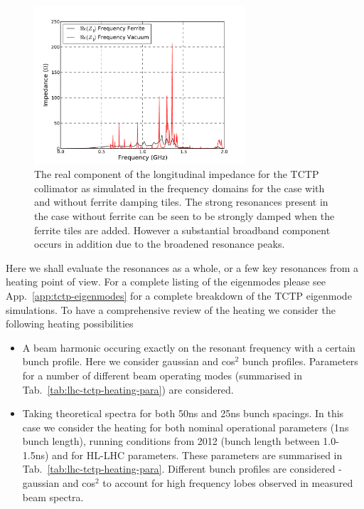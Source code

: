 \begin{figure}
\begin{center}
\includegraphics[width=0.7\textwidth]{LHC_Collimation_Upgrades/figures/longitudinal-impedance-tctp-ferr-freq-dom.pdf}
\end{center}
\caption{The real component of the longitudinal impedance for the TCTP collimator as simulated in the frequency domains for the case with and without ferrite damping tiles. The strong resonances present in the case without ferrite can be seen to be strongly damped when the ferrite tiles are added. However a substantial broadband component occurs in addition due to the broadened resonance peaks.}
\label{fig:long-imp-tctp-freq}
\end{figure}

Here we shall evaluate the resonances as a whole, or a few key resonances from a heating point of view. For a complete listing of the eigenmodes please see App.~\ref{app:tctp-eigenmodes} for a complete breakdown of the TCTP eigenmode simulations. To have a comprehensive review of the heating we consider the following heating possibilities

\begin{itemize}
\item{A beam harmonic occuring exactly on the resonant frequency with a certain bunch profile. Here we consider gaussian and cos$^{2}$ bunch profiles. Parameters for a number of different beam operating modes (summarised in Tab.~\ref{tab:lhc-tctp-heating-para}) are considered.}
\item{Taking theoretical spectra for both 50ns and 25ns bunch spacings. In this case we consider the heating for both nominal operational parameters (1ns bunch length), running conditions from 2012 (bunch length between 1.0-1.5ns) and for HL-LHC parameters. These parameters are summarised in Tab.~\ref{tab:lhc-tctp-heating-para}. Different bunch profiles are considered - gaussian and cos$^{2}$ to account for high frequency lobes observed in measured beam spectra.}
\end{itemize}

